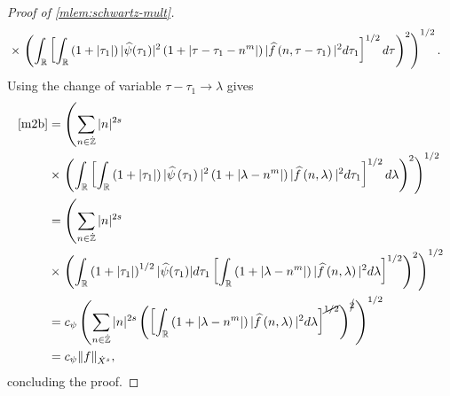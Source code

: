 \begin{proof}[Proof of \cref{mlem:schwartz-mult}]
\begin{equation}
\begin{split}
		& \times \left. \left( \int_{\mathbb{R}} \left[ \int_{\mathbb{R}}
		\left( 1 + | \tau_{1} | \right) | \widehat{\psi}(\tau_1) |^2 \left( 1 + |
		\tau - \tau_1 - n^{m} |
		\right) | \widehat{f}\left( n, \tau - \tau_1 \right) |^2 d \tau_1 
		\right]^{1/2} d \tau \right)^2 \right)^{1/2}.
	\end{split}
\end{equation}
%
%
Using the change of variable $\tau - \tau_1 \to \lambda$ gives
%
%
\begin{equation*}
	\begin{split}
		\eqref{m2b}
		& = \left( \sum_{n \in \dot{\mathbb{Z}}} |n|^{2s}\right.
		\\
		& \times \left.  \left( \int_{\mathbb{R}} \left[
		\int_{\mathbb{R}} \left( 1 + | \tau_1 | \right) | \widehat{\psi}\left( \tau_1
		\right) |^2 \left( 1 + | \lambda - n^{m} | \right) | \widehat{f} \left( n,
		\lambda
		\right)|^2 d \tau_1 \right]^{1/2} d \lambda \right)^2 \right)^{1/2}
		\\
		& =  \left( \sum_{n \in \dot{\mathbb{Z}}} |n|^{2s} \right.
		\\
		& \times \left. \left( \int_{\mathbb{R}} \left( 1 + |
		\tau_1 |
		\right)^{1/2} | \widehat{\psi}(\tau_1) | d \tau_1 \left[ \int_{\mathbb{R}} \left( 1 + |
		\lambda - n^{m} |
		\right) | \widehat{f}\left( n, \lambda \right) |^2 d \lambda \right]^{1/2}
		\right)^2 \right)^{1/2}
		\\
		& = c_{\psi} \left( \sum_{n \in \dot{\mathbb{Z}}} |n|^{2s} \left( \left[ \int_{\mathbb{R}}
		\left( 1 + | \lambda - n^{m} | \right) | \widehat{f}\left( n, \lambda
		\right) |^2 d \lambda
		\right]^{\cancel{1/2}} \right)^{\cancel{2}} \right)^{1/2}
		\\
		& = c_{\psi} \|f\|_{\dot{X}^s},
	\end{split}
\end{equation*}
%
%
concluding the proof. 
\end{proof}
%
%
%
%
%
%
